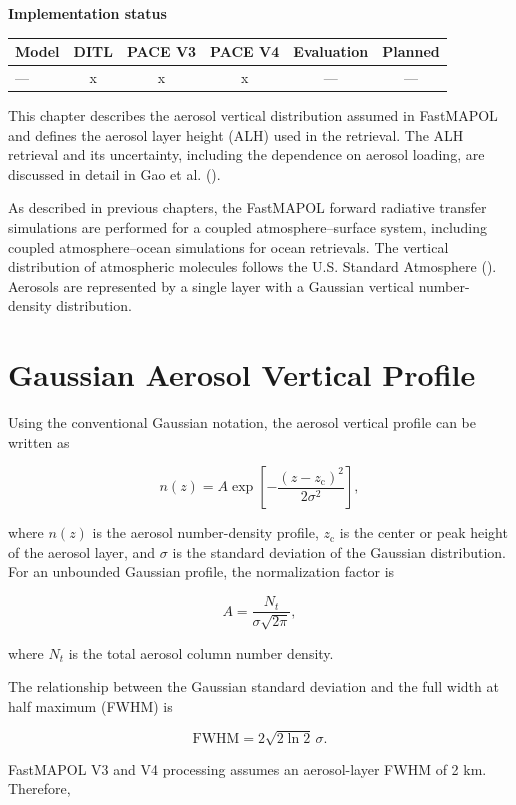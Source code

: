 \documentclass[
  11pt,
  letterpaper,
]{scrreprt}
\begin{document}
\textbf{Implementation status}

\begin{longtable}[]{@{}lccccc@{}}
\toprule\noalign{}
Model & DITL & PACE V3 & PACE V4 & Evaluation & Planned \\
\midrule\noalign{}
\endhead
\bottomrule\noalign{}
\endlastfoot
--- & x & x & x & --- & --- \\
\end{longtable}

This chapter describes the aerosol vertical distribution assumed in
FastMAPOL and defines the aerosol layer height (ALH) used in the
retrieval. The ALH retrieval and its uncertainty, including the
dependence on aerosol loading, are discussed in detail in Gao et al.
().

As described in previous chapters, the FastMAPOL forward radiative
transfer simulations are performed for a coupled atmosphere--surface
system, including coupled atmosphere--ocean simulations for ocean
retrievals. The vertical distribution of atmospheric molecules follows
the U.S. Standard Atmosphere (). Aerosols are represented by a single layer with a Gaussian
vertical number-density distribution.

\section{Gaussian Aerosol Vertical
Profile}\label{gaussian-aerosol-vertical-profile}

Using the conventional Gaussian notation, the aerosol vertical profile
can be written as

\[
n(z) =
A\exp\left[
-\frac{(z-z_{\mathrm{c}})^2}{2\sigma^2}
\right],
\]

where \(n(z)\) is the aerosol number-density profile, \(z_{\mathrm{c}}\)
is the center or peak height of the aerosol layer, and \(\sigma\) is the
standard deviation of the Gaussian distribution. For an unbounded
Gaussian profile, the normalization factor is

\[
A = \frac{N_t}{\sigma\sqrt{2\pi}},
\]

where \(N_t\) is the total aerosol column number density.

The relationship between the Gaussian standard deviation and the full
width at half maximum (FWHM) is

\[
\mathrm{FWHM}
=
2\sqrt{2\ln 2}\,\sigma.
\]

FastMAPOL V3 and V4 processing assumes an aerosol-layer FWHM of 2 km.
Therefore,
\end{document}
